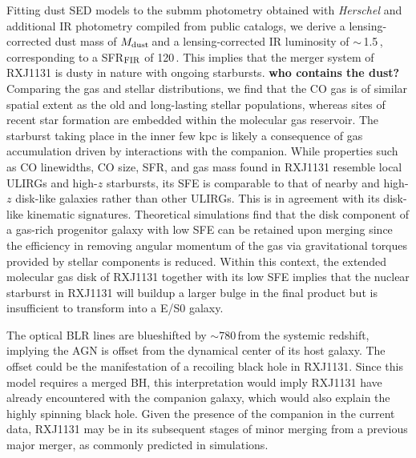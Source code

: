 \documentclass[]{emulateapj}
\begin{document}
Fitting dust SED models to the submm photometry obtained with {\it Herschel} and additional IR photometry compiled from 
public catalogs, we derive a lensing-corrected dust mass of $M_{\rm dust}$\,\Msun and
a lensing-corrected IR luminosity of \LIR$\sim$\,1.5\,\Lsun, corresponding to a
SFR$_{\rm FIR}$ of 120\,\sfrU. 
This implies that the merger system of RXJ1131 is dusty in nature with ongoing starbursts.
{\bf who contains the dust?}
Comparing the gas and stellar distributions, we
find that the CO gas is of similar spatial extent as the old and long-lasting stellar populations, whereas 
sites of recent star formation are embedded within the molecular gas reservoir.
The starburst taking place in the inner few kpc is likely a consequence of 
gas accumulation driven by interactions with the companion.
While properties such as CO linewidths, CO size, SFR, and gas mass found in RXJ1131 
resemble local ULIRGs and high-$z$ starbursts, 
its SFE is comparable to that of nearby and high-$z$ disk-like galaxies rather than 
other ULIRGs. This is in agreement with its disk-like kinematic signatures. 
Theoretical simulations find that the disk component of a gas-rich progenitor galaxy with low SFE can be
retained upon merging since the efficiency in removing angular momentum of the gas via 
gravitational torques provided by stellar components is reduced.
Within this context, the extended molecular gas disk of RXJ1131 together with its low SFE implies that
the nuclear starburst in RXJ1131 will buildup a larger bulge in the final product but is 
insufficient to transform into a E/S0 galaxy.

The optical BLR lines are blueshifted by $\sim$780\,\kms from the systemic redshift, 
implying the AGN is offset from the dynamical center of its host galaxy.  The offset could 
be the manifestation of a recoiling black hole in RXJ1131.
Since this model requires a merged BH, this interpretation would imply RXJ1131 have 
already encountered with the companion galaxy, which would also explain the highly spinning black hole. 
Given the presence of the companion in the current data, RXJ1131 may be in 
its subsequent stages of minor merging from a previous major merger, as commonly predicted in simulations.
\end{document}
